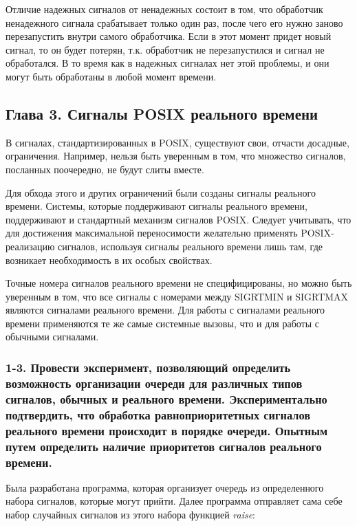 \documentclass[14pt,a4paper,report]{report}
\begin{document}
Отличие надежных сигналов от ненадежных состоит в том, что обработчик ненадежного сигнала срабатывает только один раз, после чего его нужно заново перезапустить внутри самого обработчика. Если в этот момент придет новый сигнал, то он будет потерян, т.к. обработчик не перезапустился и сигнал не обработался. В то время как в надежных сигналах нет этой проблемы, и они могут быть обработаны в любой момент времени. 

\subsection{Глава 3. Сигналы POSIX реального времени}

В сигналах, стандартизированных в POSIX, существуют свои, отчасти досадные, ограничения. Например, нельзя быть уверенным в том, что множество сигналов, посланных поочередно, не будут слиты вместе.

Для обхода этого и других ограничений были созданы сигналы реального времени. Системы, которые поддерживают сигналы реального времени, поддерживают и стандартный механизм сигналов POSIX. Следует учитывать, что для достижения максимальной переносимости желательно применять POSIX-реализацию сигналов, используя сигналы реального времени лишь там, где возникает необходимость в их особых свойствах.

Точные номера сигналов реального времени не специфицированы, но можно быть уверенным в том, что все сигналы с номерами между SIGRTMIN и SIGRTMAX являются сигналами реального времени. Для работы с сигналами реального времени применяются те же самые системные вызовы, что и для работы с обычными сигналами.

\subsubsection{1-3.   Провести эксперимент, позволяющий определить возможность организации очереди для различных типов сигналов, обычных и реального времени. Экспериментально подтвердить, что обработка равноприоритетных сигналов реального времени происходит в порядке очереди. Опытным путем определить наличие приоритетов сигналов реального времени.}

Была разработана программа, которая организует очередь из определенного набора сигналов, которые могут прийти. Далее программа отправляет сама себе набор случайных сигналов из этого набора функцией \emph{raise}:


\end{document}
